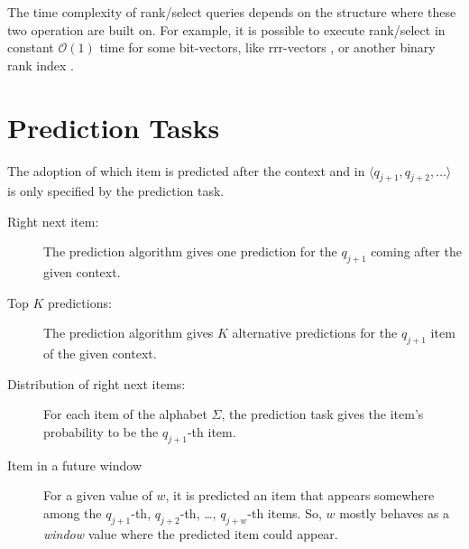 The time complexity of rank/select queries depends on the structure where these two operation are built on. For example, it is possible to execute rank/select in constant \(\mathcal{O}(1)\) time for some bit-vectors, like rrr-vectors \cite{Raman}, or another binary rank index \cite{dillabaugh_2007}.

\section{Prediction Tasks} \label{App:predtask}
The adoption of which item is predicted after the context and in \(\langle q_{j+1},q_{j+2},\ldots\rangle\) is only specified by the prediction task.
\begin{description}
  \item[Right next item:] The prediction algorithm gives one prediction for the \(q_{j+1}\) coming after the given context.
  \item[Top $K$ predictions:]  The prediction algorithm gives $K$ alternative predictions for the \(q_{j+1}\) item of the given context.
  \item[Distribution of right next items:]  For each item of the alphabet \(\Sigma\), the prediction task gives the item's probability to be the \(q_{j+1}\)-th item.
  \item[Item in a future window]  For a given value of \(w\), it is predicted an item that appears somewhere among the \(q_{j+1}\)-th, \(q_{j+2}\)-th, \ldots, \(q_{j+w}\)-th items. So, \(w\) mostly behaves as a \emph{window} value where the predicted item could appear. 
\end{description}